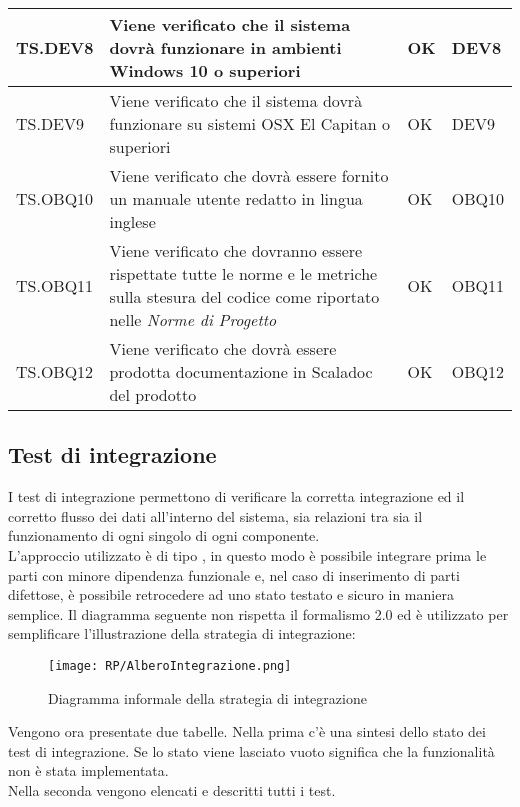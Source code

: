 \documentclass{scalatekids-article}
\begin{document}
\begin{center}
\begin{longtable}[H]{| l | p{10cm} | l | l |}
    \hline
    TS.DEV8 & Viene verificato che il sistema dovrà funzionare in ambienti Windows 10 o superiori & OK & DEV8\\
    \hline
    TS.DEV9 & Viene verificato che il sistema dovrà funzionare su sistemi OSX El Capitan o superiori & OK & DEV9\\
    \hline
    TS.OBQ10 & Viene verificato che dovrà essere fornito un manuale utente redatto in lingua inglese & OK & OBQ10\\
    \hline
    TS.OBQ11 & Viene verificato che dovranno essere rispettate tutte le norme e le metriche sulla stesura del codice come riportato nelle \textit{Norme di Progetto} & OK & OBQ11\\
    \hline
    TS.OBQ12 & Viene verificato che dovrà essere prodotta documentazione in Scaladoc del prodotto & OK & OBQ12\\
    \hline
  \end{longtable}
\end{center}

\subsection{Test di integrazione}

I test di integrazione permettono di verificare la corretta integrazione ed il
corretto flusso dei dati all'interno del sistema, sia relazioni tra
 sia il funzionamento
di ogni singolo  di ogni componente.\\
L'approccio utilizzato è di tipo , in questo modo è possibile
integrare prima le parti con minore dipendenza funzionale e, nel caso di
inserimento di parti difettose, è possibile retrocedere ad uno stato testato e
sicuro in maniera semplice. Il diagramma seguente non rispetta il formalismo
 2.0 ed è utilizzato per semplificare l'illustrazione della strategia
di integrazione:
\begin{figure}[H]
  \begin{center}
    \texttt{[image: RP/AlberoIntegrazione.png]}
    \caption{Diagramma informale della strategia di integrazione}
  \end{center}
\end{figure}

Vengono ora presentate due tabelle. Nella prima c'è una sintesi dello stato 
dei test di integrazione. Se lo stato viene lasciato vuoto significa che la funzionalità non è stata implementata.\\Nella seconda vengono elencati e descritti tutti i 
test.
\end{document}
